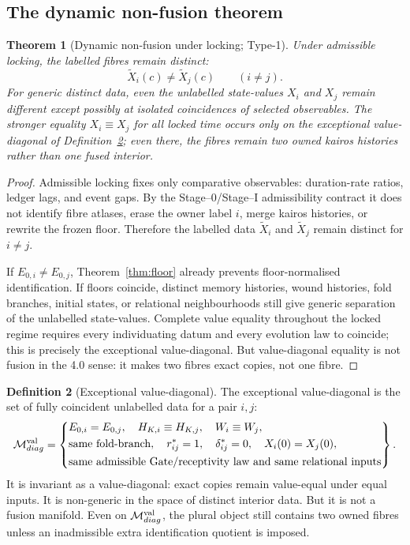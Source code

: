 \documentclass[11pt,a4paper]{article}
\def\mathfrak#1{#1}%
\def\mathrm#1{#1}%
\def\emph#1{#1}%
\theoremstyle{definition}
\newtheorem{definition}{Definition}[section]
\theoremstyle{plain}
\newtheorem{theorem}[definition]{Theorem}
\theoremstyle{remark}
\begin{document}
\subsection{The dynamic non-fusion theorem}

\begin{theorem}[Dynamic non-fusion under locking; Type-1]\label{thm:dynnofusion}
Under admissible locking, the labelled fibres remain distinct:
\[
\widetilde X_i(\mathfrak c)\neq \widetilde X_j(\mathfrak c)
\qquad
(i\neq j).
\]
For generic distinct data, even the unlabelled state-values \(X_i\) and \(X_j\)
remain different except possibly at isolated coincidences of selected observables.
The stronger equality \(X_i\equiv X_j\) for all locked time occurs only on the
exceptional value-diagonal of Definition~\ref{def:diag}; even there, the fibres
remain two owned kairos histories rather than one fused interior.
\end{theorem}

\begin{proof}
Admissible locking fixes only comparative observables: duration-rate ratios,
ledger lags, and event gaps. By the Stage--0/Stage--I admissibility contract it
does not identify fibre atlases, erase the owner label \(i\), merge kairos
histories, or rewrite the frozen floor. Therefore the labelled data
\(\widetilde X_i\) and \(\widetilde X_j\) remain distinct for \(i\neq j\).

If \(E_{0,i}\neq E_{0,j}\), Theorem~\ref{thm:floor} already prevents
floor-normalised identification. If floors coincide, distinct memory histories,
wound histories, fold branches, initial states, or relational neighbourhoods still
give generic separation of the unlabelled state-values. Complete value equality
throughout the locked regime requires every individuating datum and every
evolution law to coincide; this is precisely the exceptional value-diagonal.
But value-diagonal equality is not fusion in the 4.0 sense: it makes two fibres
exact copies, not one fibre. \qedhere
\end{proof}

\begin{definition}[Exceptional value-diagonal]\label{def:diag}
The \emph{exceptional value-diagonal} is the set of fully coincident unlabelled
data for a pair \(i,j\):
\[
\mathcal M_{\mathrm{diag}}^{\rm val}
=
\left\{
\begin{aligned}
&E_{0,i}=E_{0,j},\quad
H_{K,i}\equiv H_{K,j},\quad
W_i\equiv W_j,\\
&\text{same fold-branch},\quad
r^*_{ij}=1,\quad
\delta^*_{ij}=0,\quad
X_i(0)=X_j(0),\\
&\text{same admissible Gate/receptivity law and same relational inputs}
\end{aligned}
\right\}.
\]
It is invariant as a value-diagonal: exact copies remain value-equal under equal
inputs. It is non-generic in the space of distinct interior data. But it is not a
fusion manifold. Even on
\(\mathcal M_{\mathrm{diag}}^{\rm val}\), the plural object still contains two
owned fibres unless an inadmissible extra identification quotient is imposed.
\end{definition}
\end{document}

